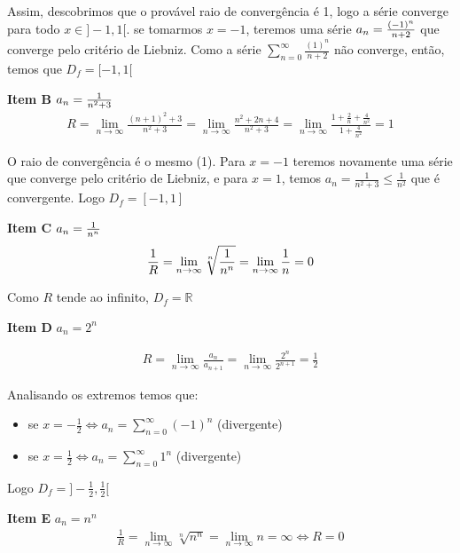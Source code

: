 \documentclass[12pt,openany, letterpaper]{book}
\newcommand{\LI}[1][n]{\lim_{{#1} \rightarrow \infty}}
\newcommand{\soma}[2][n]{\sum_{{#1} = #2}^\infty}
\begin{document}
{{Assim, descobrimos que o provável raio de convergência é 1, logo a série converge para todo $x \in ]-1,1[$. se tomarmos $x = -1$, teremos uma série $a_n = {(-1)^n \over n + 2}$ que converge pelo critério de Liebniz. Como a série $\displaystyle{\soma{0} \frac{(1)^n}{n+2}}$ não converge, então, temos que $D_f = [-1,1[$ \vspace{5mm}

\textbf{Item B} $a_n = {1 \over n^2+3}$
\begin{align*}
R = \LI \frac{(n+1)^2+3}{n^2+3} = \LI \frac{n^2 + 2n +4}{n^2+3} = \LI \frac{1 + \frac{2}{n} + \frac{4}{n^2}}{1 + \frac{4}{n^2}} = 1
\end{align*}

O raio de convergência é o mesmo (1). Para $x =-1$ teremos novamente uma série que converge pelo critério de Liebniz, e para $x = 1$, temos $a_n = \frac{1}{n^2+3} \leq \frac{1}{n^2}$ que é convergente. Logo $D_f = [-1,1]$ \vspace{5mm}

\textbf{Item C} $a_n = {1 \over n^n}$
\begin{align*}
{1 \over R} = \LI \sqrt[n]{1 \over n^n} = \LI \frac{1}{n} = 0
\end{align*}

Como $R$ tende ao infinito, $D_f = \mathds{R}$ \vspace{5mm}

\textbf{Item D} $a_n = 2^n$ \vspace{5mm}

\begin{align*}
R = \LI \frac{a_n}{a_{n+1}} = \LI \frac{2^n}{2^{n+1}} = \frac{1}{2}
\end{align*}

Analisando os extremos temos que: \begin{itemize}
\item se $\displaystyle{x = -\frac{1}{2} \Longleftrightarrow a_n = \soma{0} (-1)^n}$ (divergente)
\item se $\displaystyle{x = \frac{1}{2} \Longleftrightarrow a_n = \soma{0} 1^n}$ (divergente)
\end{itemize}

Logo $D_f = ]-\frac{1}{2},\frac{1}{2}[$ \vspace{5mm}

\textbf{Item E} $a_n = n^n$
\begin{align*}
\frac{1}{R} = \LI \sqrt[n]{n^n} = \LI n = \infty \Longleftrightarrow R = 0
\end{align*}

}}
\end{document}
